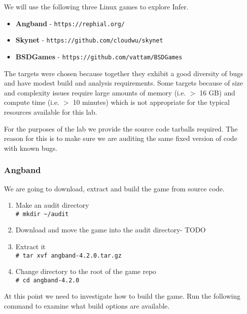 We will use the following three Linux games to explore Infer.

\begin{itemize}
	\itemsep0em 
	\item \textbf{Angband} - \verb|https://rephial.org/|
	\item \textbf{Skynet} - \verb|https://github.com/cloudwu/skynet|
	\item \textbf{BSDGames} - \verb|https://github.com/vattam/BSDGames|
\end{itemize}

The targets were chosen because together they exhibit a good diversity of bugs
and have modest build and analysis requirements. 
Some targets because of size and complexity issues require large amounts of 
memory (i.e. $>$ 16 GB) and compute time (i.e. $>$ 10 minutes) which is not appropriate
for the typical resources available for this lab.

For the purposes of the lab we provide the source code tarballs required. The reason
for this is to make sure we are auditing the same fixed version of code with known bugs.

\subsubsection{Angband}

We are going to download, extract and build the game from source code.


\begin{enumerate}
	\itemsep0em
	\item Make an audit directory\\
	\verb|# mkdir ~/audit|
	\item Download and move the game into the audit directory- TODO 
	\item Extract it\\
	\verb|# tar xvf angband-4.2.0.tar.gz|
	\item Change directory to the root of the game repo	\\
	\verb|# cd angband-4.2.0|	
\end{enumerate}

At this point we need to investigate how to build the game.
Run the following command to examine what build options are available.

\vspace{0.5cm}


